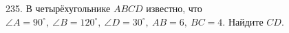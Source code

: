 235. В четырёхугольнике $ABCD$ известно, что $\angle A=90^\circ,\ \angle B=120^\circ,\ \angle D=30^\circ,\ AB=6,\ BC=4.$ Найдите $CD.$\\
